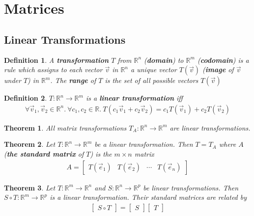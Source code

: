\documentclass{article}
\theoremstyle{sltheorem}
\newtheorem{definition}{Definition}[section]
\newtheorem{theorem}{Theorem}[section]
\begin{document}
\setcounter{section}{2}
\section{Matrices}
\setcounter{subsection}{5}
\subsection{Linear Transformations}
\begin{definition}
    A \textbf{transformation} $T$ from $\mathbb{R}^n$ (\textbf{domain}) to $\mathbb{R}^m$ (\textbf{codomain}) is a rule which assigns to each vector $\vec v$ in $\mathbb{R}^n$ a unique vector $T(\vec v)$ (\textbf{image} of $\vec v$ under $T$) in $\mathbb{R}^m$. 
    The \textbf{range} of $T$ is the set of all possible vectors $T(\vec v)$
\end{definition}
\begin{definition}
   $T:\mathbb{R}^n \to \mathbb{R}^m$ is a \textbf{linear transformation} iff
    \begin{align*}        
        \forall \vec v_1, \vec v_2 \in \mathbb{R}^n.\:\forall c_1, c_2 \in \mathbb{R}.\: T(c_1\vec v_1 + c_2\vec v_2) = c_1T(\vec v_1) + c_2T(\vec v_2)
    \end{align*}
\end{definition}
\begin{theorem}
    All matrix transformations $T_A:\mathbb{R}^n\to\mathbb{R}^m$ are linear transformations.
\end{theorem}
\begin{theorem}
    Let $T:\mathbb{R}^n\to\mathbb{R}^m$ be a linear transformation. Then $T=T_A$ where $A$ (\textbf{the standard matrix} of $T$) is the $m\times n$ matrix 
    \begin{align*}
        A = \begin{bmatrix}
            T(\vec e_1) & T(\vec e_2) & \cdots & T(\vec e_n)
        \end{bmatrix}
    \end{align*}
\end{theorem}
\begin{theorem}
    Let $T:\mathbb{R}^m\to\mathbb{R}^n$ and $S:\mathbb{R}^n\to\mathbb{R}^p$ be linear transformations. Then $S\circ T:\mathbb{R}^m\to\mathbb{R}^p$ is a linear transformation. Their standard matrices are related by
    \begin{align*}
        \begin{bmatrix}
            S\circ T
        \end{bmatrix}
        = \begin{bmatrix}
            S
        \end{bmatrix}
        \begin{bmatrix}
            T
        \end{bmatrix}
    \end{align*}
\end{theorem}
\end{document}
